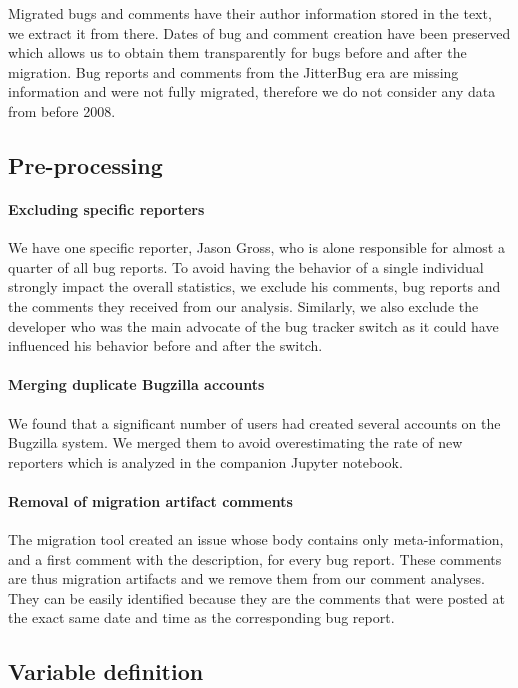 \documentclass[conference]{IEEEtran}
\begin{document}
Migrated bugs and comments have their author information stored in the text, we extract it from there. Dates of bug and comment creation have been preserved which allows us to obtain them transparently for bugs before and after the migration. Bug reports and comments from the JitterBug era are missing information and were not fully migrated, therefore we do not consider any data from before 2008.

\subsection{Pre-processing}

\paragraph{Excluding specific reporters}
We have one specific reporter, Jason Gross, who is alone responsible for almost a quarter of all bug reports. To avoid having the behavior of a single individual strongly impact the overall statistics, we exclude his comments, bug reports and the comments they received from our analysis. Similarly, we also exclude the developer who was the main advocate of the bug tracker switch as it could have influenced his behavior before and after the switch.

\paragraph{Merging duplicate Bugzilla accounts}
We found that a significant number of users had created several accounts on the Bugzilla system. We merged them to avoid overestimating the rate of new reporters which is analyzed in the companion Jupyter notebook.

\paragraph{Removal of migration artifact comments}
The migration tool created an issue whose body contains only meta-information, and a first comment with the description, for every bug report. These comments are thus migration artifacts and we remove them from our comment analyses. They can be easily identified because they are the comments that were posted at the exact same date and time as the corresponding bug report.

\subsection{Variable definition}
\end{document}
